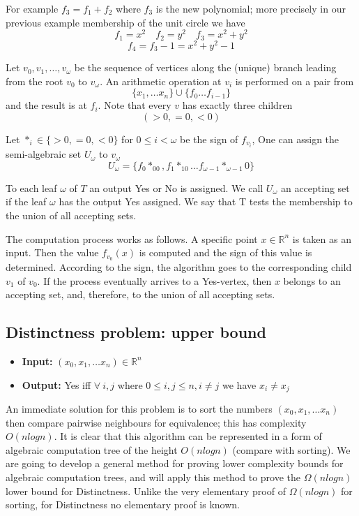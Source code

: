 \documentclass{article}
\theoremstyle{definition}
\begin{document}
For example $f_3 = f_1 + f_2$ where $f_3$ is the new polynomial;
more precisely in our previous example membership of the unit circle
we have
$$f_1 = x^2 \quad f_2 = y^2 \quad f_3 = x^2 + y^2$$
$$f_4 = f_3 - 1 = x^2 + y^2 - 1$$

Let $v_0, v_1,\dots, v_\omega$ be the sequence of vertices
along the (unique) branch leading from the root $v_0$ to $v_\omega$.
An arithmetic operation at $v_i$ is performed on a pair from
$$\{x_1,\dots x_n\} \cup \{f_0\dots f_{i - 1}\}$$
and the result is at $f_i$.
Note that every $v$ has exactly three children
$$(> 0, = 0, < 0)$$

Let $*_i \in \{>0,=0,<0\}$ for $0 \leq i < \omega$ be the sign of $f_{v_i}$,
One can assign the semi-algebraic set $U_\omega$ to $v_\omega$
$$U_\omega = \{f_0*_00,f_1*_10\dots f_{\omega - 1} *_{\omega - 1}0\}$$

To each leaf $\omega$ of $T$ an output Yes or No is assigned.
We call $U_\omega$ an accepting set if the leaf $\omega$ has the output Yes assigned.
We say that T tests the membership to the union of all accepting sets.

The computation process works as follows.
A specific point $x \in \mathbb{R}^n$ is taken as an input.
Then the value $f_{v_0}(x)$ is computed and the sign of this value is determined.
According to the sign, the algorithm goes to the corresponding child $v_1$ of $v_0$.
If the process eventually arrives to a Yes-vertex, then $x$ belongs to an accepting set,
and, therefore, to the union of all accepting sets.

\subsection{Distinctness problem: upper bound}
\begin{itemize}
    \item \textbf{Input:} $(x_0, x_1,\dots x_n) \in \mathbb{R}^n$
    \item \textbf{Output:} Yes iff $\forall\ i,j$ where $0 \leq i,j \leq n, i \neq j$ we have $x_i \neq x_j$
\end{itemize}
An immediate solution for this problem is to sort the numbers $(x_0, x_1,\dots x_n)$
then compare pairwise neighbours for equivalence; this has complexity $O(nlogn)$.
It is clear that this algorithm can be represented in a form of algebraic computation tree
of the height $O(nlogn)$ (compare with sorting).
We are going to develop a general method for proving lower complexity bounds for algebraic computation trees,
and will apply this method to prove the $\Omega(nlogn)$ lower bound for Distinctness.
Unlike the very elementary proof of $\Omega(nlogn)$ for sorting,
for Distinctness no elementary proof is known.
\end{document}
